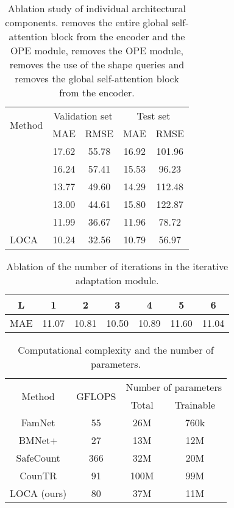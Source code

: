 \documentclass[10pt,twocolumn,letterpaper]{article}
\begin{document}
\begin{table}[htbp]
    \centering
    \begin{tabular}{l c c c c}
        \toprule
        \multirow{2}{*}{Method}& \multicolumn{2}{c}{Validation set} & \multicolumn{2}{c}{Test set} \\
        & MAE & RMSE & MAE & RMSE \\ 
        \midrule
          & 17.62 & 55.78 & 16.92 & 101.96 \\
          & 16.24 & 57.41 & 15.53 & 96.23 \\
           & 13.77 & 49.60 & 14.29 & 112.48 \\
           & 13.00 & 44.61 & 15.80 & 122.87 \\
         & 11.99 & 36.67 & 11.96 & 78.72 \\
        LOCA               & 10.24 & 32.56 & 10.79 & 56.97 \\
        \bottomrule
    \end{tabular}
    \caption{Ablation study of individual architectural components.  removes the entire global self-attention block from the encoder and the OPE module,   removes the OPE module,  removes the use of the shape queries and  removes the global self-attention block from the encoder.}
    \label{tab:ablation_components}
\end{table}





\begin{table}[htbp]
    \centering
    \begin{tabular}{c c c c c c c}
        \toprule
        L & 1 & 2 & 3 & 4 & 5 & 6\\ 
        \midrule
        MAE & 11.07 & 10.81 & 10.50 & 10.89 & 11.60 & 11.04 \\
        \bottomrule
    \end{tabular}
    \caption{Ablation of the number of iterations  in the iterative adaptation module. }
    \label{tab:ablation_L}
\end{table}

\begin{table}[htbp]
\centering
\begin{tabular}{c c c c}
 \toprule
 \multirow{2}{*}{Method} & \multirow{2}{*}{GFLOPS} & \multicolumn{2}{c}{Number of parameters} \\
 & & Total & Trainable \\
 \midrule
 FamNet & 55 & 26M & 760k \\
 BMNet+ & 27 & 13M & 12M \\
 SafeCount & 366 & 32M & 20M  \\
 CounTR & 91 & 100M & 99M \\
 LOCA (ours) & 80 & 37M & 11M \\  
 \bottomrule
\end{tabular}
\caption{Computational complexity and the number of parameters.}
\label{tab:params}
\end{table}
\end{document}
